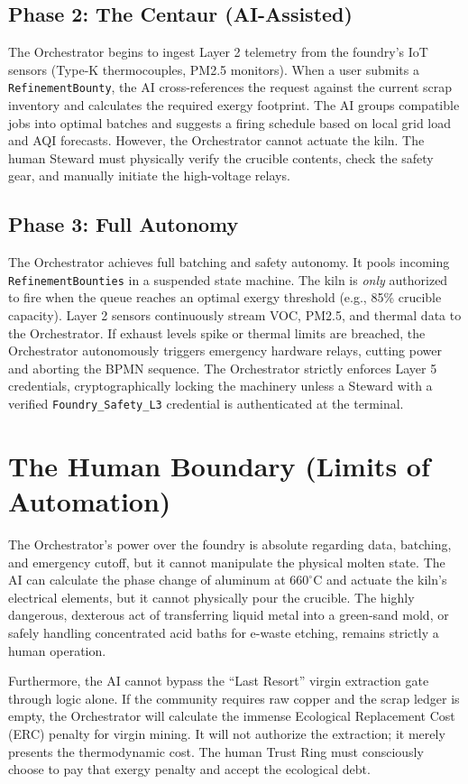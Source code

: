 \subsection{Phase 2: The Centaur (AI-Assisted)}
The Orchestrator begins to ingest Layer 2 telemetry from the foundry's IoT sensors (Type-K thermocouples, PM2.5 monitors). When a user submits a \texttt{RefinementBounty}, the AI cross-references the request against the current scrap inventory and calculates the required exergy footprint. The AI groups compatible jobs into optimal batches and suggests a firing schedule based on local grid load and AQI forecasts. However, the Orchestrator cannot actuate the kiln. The human Steward must physically verify the crucible contents, check the safety gear, and manually initiate the high-voltage relays.

\subsection{Phase 3: Full Autonomy}
The Orchestrator achieves full batching and safety autonomy. It pools incoming \texttt{RefinementBounties} in a suspended state machine. The kiln is \textit{only} authorized to fire when the queue reaches an optimal exergy threshold (e.g., 85\% crucible capacity). Layer 2 sensors continuously stream VOC, PM2.5, and thermal data to the Orchestrator. If exhaust levels spike or thermal limits are breached, the Orchestrator autonomously triggers emergency hardware relays, cutting power and aborting the BPMN sequence. The Orchestrator strictly enforces Layer 5 credentials, cryptographically locking the machinery unless a Steward with a verified \texttt{Foundry\_Safety\_L3} credential is authenticated at the terminal.

\section{The Human Boundary (Limits of Automation)}
The Orchestrator's power over the foundry is absolute regarding data, batching, and emergency cutoff, but it cannot manipulate the physical molten state. The AI can calculate the phase change of aluminum at $660^\circ\text{C}$ and actuate the kiln's electrical elements, but it cannot physically pour the crucible. The highly dangerous, dexterous act of transferring liquid metal into a green-sand mold, or safely handling concentrated acid baths for e-waste etching, remains strictly a human operation.

Furthermore, the AI cannot bypass the ``Last Resort'' virgin extraction gate through logic alone. If the community requires raw copper and the scrap ledger is empty, the Orchestrator will calculate the immense Ecological Replacement Cost (ERC) penalty for virgin mining. It will not authorize the extraction; it merely presents the thermodynamic cost. The human Trust Ring must consciously choose to pay that exergy penalty and accept the ecological debt.

